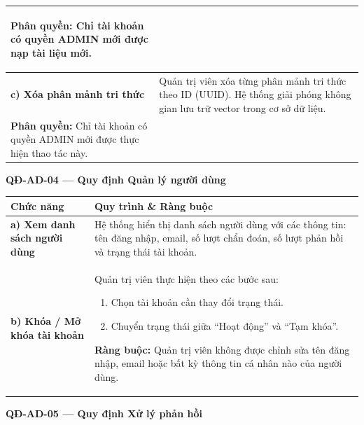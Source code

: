 \documentclass[12pt,a4paper]{article}
\begin{document}
\begin{longtable}{|
        >{\raggedright\arraybackslash}p{2.8cm}|
        >{\raggedright\arraybackslash}p{12cm}|}
\begin{itemize}[leftmargin=*,topsep=2pt,itemsep=1pt]
    \end{itemize}
    \textbf{Phân quyền:} Chỉ tài khoản có quyền ADMIN mới được nạp tài liệu mới.                                                              \\
    \hline
    \textbf{c) Xóa phân mảnh tri thức}            &
    Quản trị viên xóa từng phân mảnh tri thức theo ID (UUID). Hệ thống giải phóng không gian lưu trữ vector trong cơ sở dữ liệu.              \\
    \textbf{Phân quyền:} Chỉ tài khoản có quyền ADMIN mới được thực hiện thao tác này.                                                        \\
    \hline
\end{longtable}

\vspace{0.3cm}
\noindent\textbf{QĐ-AD-04 --- Quy định Quản lý người dùng}

\begin{longtable}{|
        >{\raggedright\arraybackslash}p{2.8cm}|
        >{\raggedright\arraybackslash}p{12cm}|}
    \hline
    \rowcolor{headerblue}
    \textbf{Chức năng}                   & \textbf{Quy trình \& Ràng buộc}                                                                       \\
    \hline
    \endhead
    \textbf{a) Xem danh sách người dùng} &
    Hệ thống hiển thị danh sách người dùng với các thông tin: tên đăng nhập, email, số lượt chẩn đoán, số lượt phản hồi và trạng thái tài khoản. \\
    \hline
    \textbf{b) Khóa / Mở khóa tài khoản} &
    Quản trị viên thực hiện theo các bước sau:
    \begin{enumerate}[leftmargin=*,topsep=2pt,itemsep=1pt]
        \item Chọn tài khoản cần thay đổi trạng thái.
        \item Chuyển trạng thái giữa ``Hoạt động'' và ``Tạm khóa''.
    \end{enumerate}
    \textbf{Ràng buộc:} Quản trị viên không được chỉnh sửa tên đăng nhập, email hoặc bất kỳ thông tin cá nhân nào của người dùng.                \\
    \hline
\end{longtable}

\vspace{0.3cm}
\noindent\textbf{QĐ-AD-05 --- Quy định Xử lý phản hồi}
\end{document}

